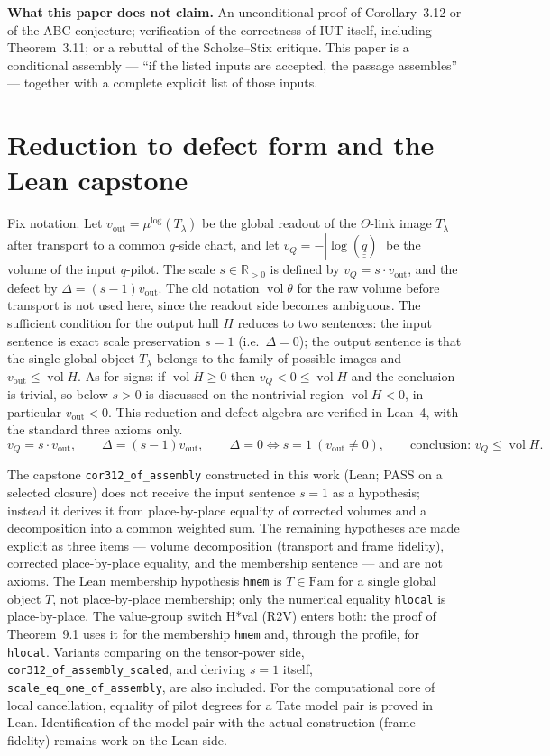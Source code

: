 \documentclass[11pt]{article}
\newcommand{\uu}[1]{\underline{\underline{#1}}}
\begin{document}
\medskip
\noindent\textbf{What this paper does not claim.}  An unconditional
proof of Corollary~3.12 or of the ABC conjecture; verification of
the correctness of IUT itself, including Theorem~3.11; or a rebuttal
of the Scholze--Stix critique.  This paper is a conditional assembly
--- ``if the listed inputs are accepted, the passage assembles'' ---
together with a complete explicit list of those inputs.

\section{Reduction to defect form and the Lean capstone}

Fix notation.  Let $v_{\mathrm{out}}=\mu^{\log}(T_\lambda)$ be the
global readout of the $\Theta$-link image $T_\lambda$ after transport
to a common $q$-side chart, and let
$v_Q=-|\log(\uu q)|$ be the volume of the input $q$-pilot.  The
scale $s\in\mathbb R_{>0}$ is defined by $v_Q=s\cdot
v_{\mathrm{out}}$, and the defect by
$\Delta=(s-1)v_{\mathrm{out}}$.  The old notation
$\operatorname{vol}\theta$ for the raw volume before transport is
not used here, since the readout side becomes ambiguous.  The
sufficient condition for the output hull $H$ reduces to two
sentences: the input sentence is exact scale preservation $s=1$
(i.e.\ $\Delta=0$); the output sentence is that the single global
object $T_\lambda$ belongs to the family of possible images and
$v_{\mathrm{out}}\le\operatorname{vol}H$.  As for signs: if
$\operatorname{vol}H\ge0$ then $v_Q<0\le\operatorname{vol}H$ and
the conclusion is trivial, so below $s>0$ is discussed on the
nontrivial region $\operatorname{vol}H<0$, in particular
$v_{\mathrm{out}}<0$.  This reduction and defect algebra are
verified in Lean~4, with the standard three axioms only.
\[
v_Q=s\cdot v_{\mathrm{out}},\qquad
\Delta=(s-1)v_{\mathrm{out}},\qquad
\Delta=0\iff s=1\ (v_{\mathrm{out}}\ne0),\qquad
\text{conclusion: }v_Q\le\operatorname{vol}H.
\]

The capstone \texttt{cor312\_of\_assembly} constructed in this work
(Lean; PASS on a selected closure) does not receive the input
sentence $s=1$ as a hypothesis; instead it derives it from
place-by-place equality of corrected volumes and a decomposition
into a common weighted sum.  The remaining hypotheses are made
explicit as three items --- volume decomposition (transport and
frame fidelity), corrected place-by-place equality, and the
membership sentence --- and are not axioms.  The Lean membership
hypothesis \texttt{hmem} is $T\in\mathrm{Fam}$ for a single global
object $T$, not place-by-place membership; only the numerical
equality \texttt{hlocal} is place-by-place.  The value-group switch
H*val (R2V) enters both: the proof of Theorem~9.1 uses it for the
membership \texttt{hmem} and, through the profile, for
\texttt{hlocal}.  Variants comparing on
the tensor-power side, \texttt{cor312\_of\_assembly\_scaled}, and
deriving $s=1$ itself, \texttt{scale\_eq\_one\_of\_assembly}, are
also included.  For the computational core of local cancellation,
equality of pilot degrees for a Tate model pair is proved in Lean.
Identification of the model pair with the actual construction
(frame fidelity) remains work on the Lean side.
\end{document}
